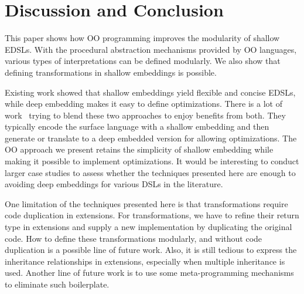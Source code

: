 \section{Discussion and Conclusion}
This paper shows how OO programming improves the modularity of shallow EDSLs.
With the procedural abstraction mechanisms provided by OO languages, various types of
interpretations can be defined modularly. We also show that defining
transformations in shallow embeddings is possible.

Existing work showed that shallow embeddings yield flexible and concise EDSLs, while deep embedding makes
it easy to define optimizations.
There is a lot of work~\cite{svenningsson2012combining,
  Jovanovic:2014:YCD:2658761.2658771, scherr2014implicit} trying to blend these two
approaches to enjoy benefits from both.
They typically encode the surface language with a shallow embedding and
then generate or translate to a deep embedded version for allowing optimizations.
The OO approach we present retains the simplicity of shallow embedding while
making it possible to implement optimizations. It would be interesting
to conduct larger case studies to assess whether the techniques
presented here are enough to avoiding deep embeddings for various DSLs
in the literature.

One limitation of the techniques presented here is that
transformations require code duplication in extensions.  For
transformations, we have to refine their return type in extensions and
supply a new implementation by duplicating the original code.  How to
define these transformations modularly, and without code duplication
is a possible line of future work.  Also, it is still tedious to
express the inheritance relationships in extensions, especially when
multiple inheritance is used. Another line of future work is to use
some meta-programming mechanisms to eliminate such boilerplate.
